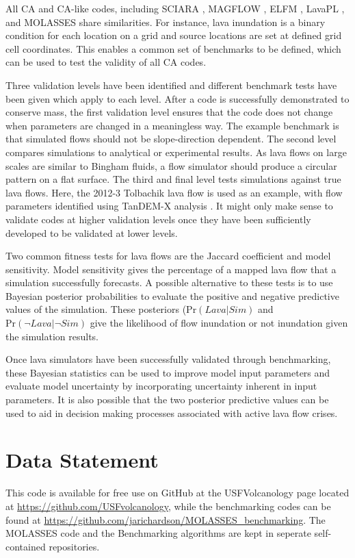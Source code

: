 	All CA and CA-like codes, including SCIARA \citep{crisci2004simulation}, MAGFLOW \citep{del2008simulations}, ELFM \citep{damiani2006lava}, LavaPL \citep{connor2012}, and MOLASSES share similarities. For instance, lava inundation is a binary condition for each location on a grid and source locations are set at defined grid cell coordinates. This enables a common set of benchmarks to be defined, which can be used to test the validity of all CA codes.
	
	Three validation levels have been identified and different benchmark tests have been given which apply to each level. After a code is successfully demonstrated to conserve mass, the first validation level ensures that the code does not change when parameters are changed in a meaningless way. The example benchmark is that simulated flows should not be slope-direction dependent. The second level compares simulations to analytical or experimental results. As lava flows on large scales are similar to Bingham fluids, a flow simulator should produce a circular pattern on a flat surface. The third and final level tests simulations against true lava flows. Here, the 2012-3 Tolbachik lava flow is used as an example, with flow parameters identified using TanDEM-X analysis \citep{kubanek2015lava}. It might only make sense to validate codes at higher validation levels once they have been sufficiently developed to be validated at lower levels.
	
	Two common fitness tests for lava flows are the Jaccard coefficient and model sensitivity. Model sensitivity gives the percentage of a mapped lava flow that a simulation successfully forecasts. A possible alternative to these tests is to use Bayesian posterior probabilities to evaluate the positive and negative predictive values of the simulation. These posteriors ($\text{Pr}(Lava|Sim)$ and $\text{Pr}(\neg Lava|\neg Sim)$ give the likelihood of flow inundation or not inundation given the simulation results.
	
	Once lava simulators have been successfully validated through benchmarking, these Bayesian statistics can be used to improve model input parameters and evaluate model uncertainty by incorporating uncertainty inherent in input parameters. It is also possible that the two posterior predictive values can be used to aid in decision making processes associated with active lava flow crises.
	
	
\section{Data Statement}
This code is available for free use on GitHub at the USFVolcanology page located at \url{https://github.com/USFvolcanology}, while the benchmarking codes can be found at \url{https://github.com/jarichardson/MOLASSES_benchmarking}. The MOLASSES code and the Benchmarking algorithms are kept in seperate self-contained repositories.

